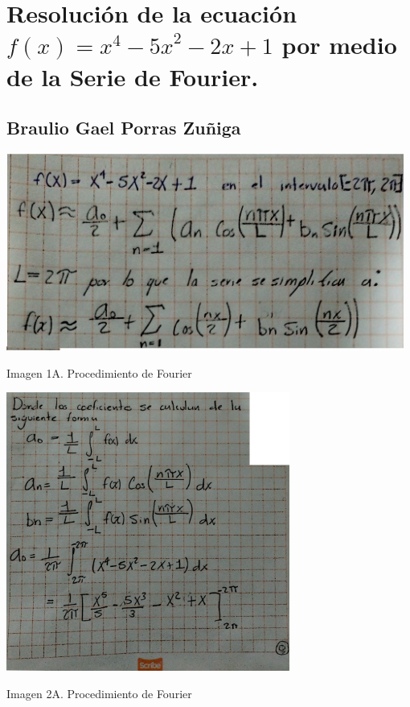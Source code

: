 \section{Resolución de la ecuación \(f(x)  = x^4 - {5x}^{2} - 2x + 1\) por medio de la Serie de Fourier.}

\subsection{Braulio Gael Porras Zuñiga}

\includegraphics[width=5.15104in,height=2.54129in]{media/image52.png}

Imagen 1A. Procedimiento de Fourier

\includegraphics[width=3.66667in,height=3.60643in]{media/image49.png}

Imagen 2A. Procedimiento de Fourier


